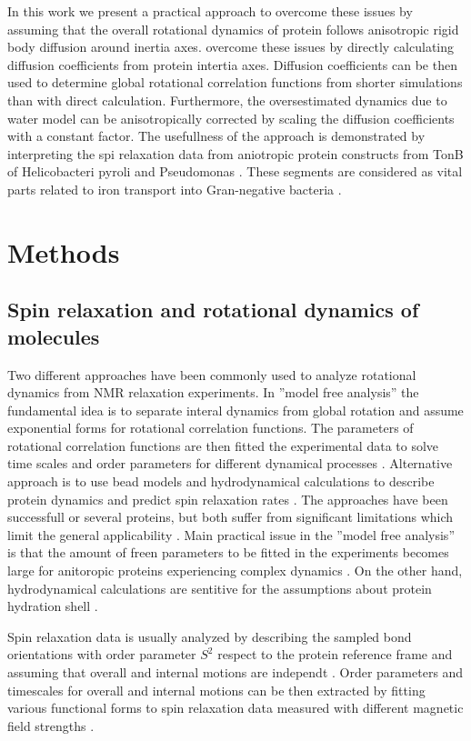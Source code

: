 \documentclass[pre,aps,floatfix,authordate1-4,twocolumn]{revtex4-1}
\begin{document}
In this work we present a practical approach to overcome these issues
by assuming that the overall rotational dynamics of protein follows
anisotropic rigid body diffusion around inertia axes. 
overcome these issues by directly calculating diffusion
coefficients from protein intertia axes. Diffusion coefficients can be then
used to determine global rotational correlation functions from shorter simulations
than with direct calculation. Furthermore, the oversestimated dynamics due to water model
can be anisotropically corrected by scaling the diffusion coefficients with a constant
factor. The usefullness of the approach is demonstrated by interpreting the
spi relaxation data from aniotropic protein constructs from TonB
of Helicobacteri pyroli \cite{??} and Pseudomonas \cite{??}.
These segments are considered as vital parts related to iron transport
into Gran-negative bacteria \cite{??}.


\section{Methods}

\subsection{Spin relaxation and rotational dynamics of molecules}

Two different approaches have been commonly used to analyze
rotational dynamics from NMR relaxation experiments. In
''model free analysis'' the fundamental idea is to separate
interal dynamics from global rotation and assume exponential
forms for rotational correlation functions. The parameters of
rotational correlation functions are then fitted the experimental
data to solve time scales and order parameters for different dynamical
processes \cite{dosset00,??}. Alternative approach is to use bead models and hydrodynamical
calculations to describe protein dynamics and predict spin relaxation rates \cite{torre00}.
The approaches have been successfull or several proteins, but both suffer
from significant limitations which limit the general applicability \cite{??}.
Main practical issue in the ''model free analysis'' is that the amount of
freen parameters to be fitted in the experiments becomes large for anitoropic
proteins experiencing complex dynamics \cite{??}. On the other hand,
hydrodynamical calculations are sentitive for the assumptions about
protein hydration shell \cite{torre00}.


Spin relaxation data is usually analyzed by describing the sampled bond
orientations with order parameter $S^2$ respect to the protein reference frame
and assuming that overall and internal motions are independt \cite{??,korzhnev01}.
Order parameters and timescales for overall and internal motions can be then
extracted by fitting various functional forms to spin relaxation data
measured with different magnetic field strengths \cite{jarymowycz06,korzhnev01}.
\end{document}
